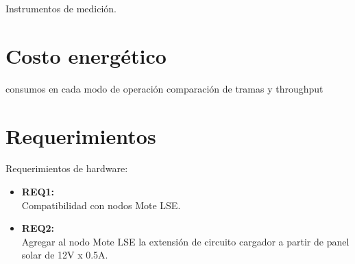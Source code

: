 Instrumentos de medición. 


\section{Costo energético}
\label{sec:costo}
consumos en cada modo de operación
comparación de tramas y throughput


\clearpage
\section{Requerimientos}
\label{sec:requerimientos}

\noindent Requerimientos de hardware:
\begin{itemize}
	\item \textbf{REQ1:}\\ Compatibilidad con nodos Mote LSE.
	\item \textbf{REQ2:}\\ Agregar al nodo Mote LSE la extensión de circuito cargador a partir de panel solar de 12V x 0.5A.
\end{itemize}
	
